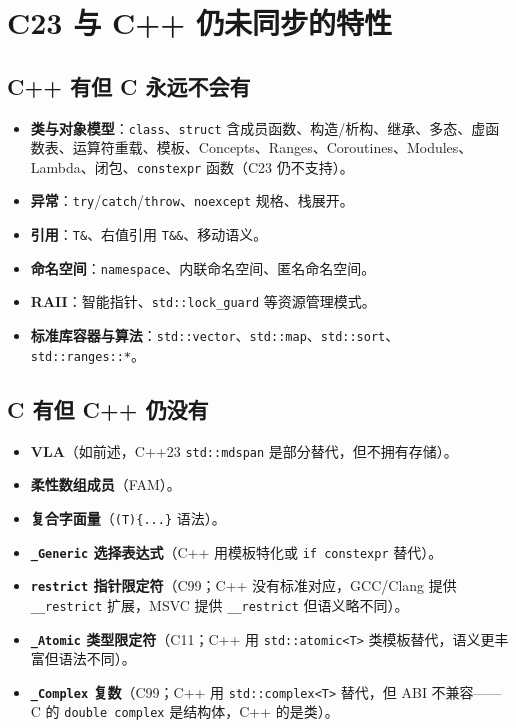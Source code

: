 \documentclass[12pt,a4paper,fontset=fandol]{ctexbook}
\newcommand{\cpp}[1]{C++#1}
\newcommand{\kw}[1]{\texttt{#1}}
\begin{document}

\chapter{C23 与 C++ 仍未同步的特性}

\section{C++ 有但 C 永远不会有}

\begin{itemize}
  \item \textbf{类与对象模型}：\kw{class}、\kw{struct} 含成员函数、构造/析构、继承、多态、虚函数表、运算符重载、模板、Concepts、Ranges、Coroutines、Modules、Lambda、闭包、\kw{constexpr} 函数（C23 仍不支持）。
  \item \textbf{异常}：\kw{try}/\allowbreak{}\kw{catch}/\allowbreak{}\kw{throw}、\kw{noexcept} 规格、栈展开。
  \item \textbf{引用}：\kw{T\&}、右值引用 \kw{T\&\&}、移动语义。
  \item \textbf{命名空间}：\kw{namespace}、内联命名空间、匿名命名空间。
  \item \textbf{RAII}：智能指针、\kw{std::lock\_guard} 等资源管理模式。
  \item \textbf{标准库容器与算法}：\kw{std::vector}、\kw{std::map}、\kw{std::sort}、\kw{std::ranges::*}。
\end{itemize}

\section{C 有但 C++ 仍没有}

\begin{itemize}
  \item \textbf{VLA}（如前述，C++23 \kw{std::mdspan} 是部分替代，但不拥有存储）。
  \item \textbf{柔性数组成员}（FAM）。
  \item \textbf{复合字面量}（\kw{(T)\{...\}} 语法）。
  \item \textbf{\kw{\_Generic} 选择表达式}（C++ 用模板特化或 \kw{if constexpr} 替代）。
  \item \textbf{\kw{restrict} 指针限定符}（C99；\cpp{} 没有标准对应，GCC/Clang 提供 \kw{\_\_restrict} 扩展，MSVC 提供 \kw{\_\_restrict} 但语义略不同）。
  \item \textbf{\kw{\_Atomic} 类型限定符}（C11；\cpp{} 用 \kw{std::atomic<T>} 类模板替代，语义更丰富但语法不同）。
  \item \textbf{\kw{\_Complex} 复数}（C99；\cpp{} 用 \kw{std::complex<T>} 替代，但 ABI 不兼容——C 的 \kw{double complex} 是结构体，\cpp{} 的是类）。
\end{itemize}
\end{document}
